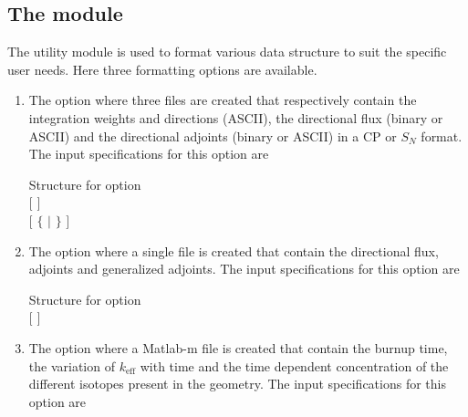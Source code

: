 \subsection{The  module}\label{sect:FMTData}

The utility module  is used to format various data structure to suit the specific user needs.  Here three formatting options are available.
 \begin{enumerate}
\item The  option where three files are created that respectively contain the integration weights and directions (ASCII), the directional flux (binary or ASCII) and the
directional adjoints (binary or ASCII) in a CP or $S_{N}$ format.\cite{Kodeli2001a,Bidaud2009a} The input specifications for this option are  

\begin{DataStructure}{Structure  for  option}%
   \moc{:=}      \moc{::}\\ 
\hspace{1.0cm} $[$   $]$ \\
\hspace{1.0cm}  $[$ $\{$  $|$  $\}$ $]$
\end{DataStructure}

\item The  option where a single file is created that contain the directional flux, adjoints and generalized adjoints. The input specifications for this option are

\begin{DataStructure}{Structure  for  option}%
 \moc{:=}      \moc{::} \\ 
\hspace{1.0cm} $[$   $]$ \\
\hspace{1.0cm}  
\end{DataStructure}

\item The  option where a Matlab-m file is created that contain the burnup time, the variation of $k_{\text{eff}}$ with time and the time dependent concentration of the different isotopes present in the geometry. The input specifications for this option are 


\end{enumerate}
